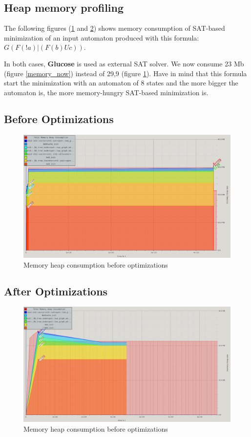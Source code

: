 \begin{landscape}
\section{Heap memory profiling}
\label{memory_profiling}

The following figures (\ref{fig:memory_before} and \ref{fig:memory_now}) shows memory consumption
of SAT-based minimization of an input automaton produced with this formula: $G(F(!a) | (F(b) U c))$.

In both cases, \textbf{Glucose} is used as external SAT solver. We now consume 23 Mb
(figure \ref{memory_now}) instead of 29,9 (figure \ref{fig:memory_before}). Have in mind that
this formula start the minimization with an automaton of 8 states and the more bigger the automaton is, the
more memory-hungry SAT-based minimization is.

\subsection{Before Optimizations}

\begin{figure}[H]
 \centering
 \includegraphics[scale=0.6]{img/memory_before.png}
 \caption{Memory heap consumption before optimizations}
 \label{fig:memory_before}
\end{figure}

\subsection{After Optimizations}
\begin{figure}[H]
 \centering
 \includegraphics[scale=0.6]{img/memory_now.png}
 \caption{Memory heap consumption before optimizations}
 \label{fig:memory_now}
\end{figure}

\end{landscape}